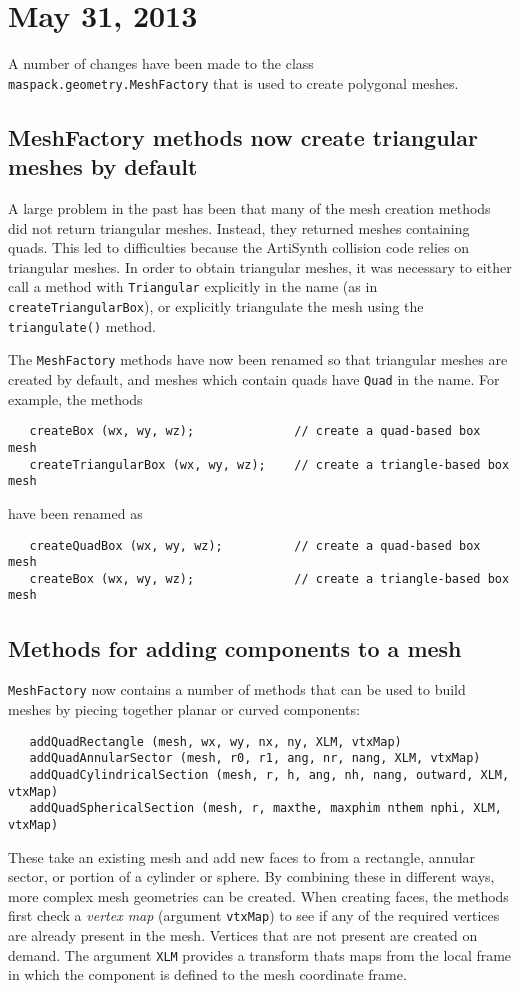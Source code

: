 \documentclass{article}
\begin{document}
\section*{May 31, 2013}

A number of changes have been made to the class {\tt
maspack.geometry.MeshFactory} that is used to create polygonal meshes.

\subsection*{MeshFactory methods now create triangular meshes by
default}

A large problem in the past has been that many of the mesh creation
methods did not return triangular meshes. Instead, they returned
meshes containing quads. This led to difficulties because the
ArtiSynth collision code relies on triangular meshes. In order to
obtain triangular meshes, it was necessary to either call a method
with {\tt Triangular} explicitly in the name (as in {\tt
createTriangularBox}), or explicitly triangulate the mesh using the
{\tt triangulate()} method.

The {\tt MeshFactory} methods have now been renamed so that triangular
meshes are created by default, and meshes which contain quads have
{\tt Quad} in the name. For example, the methods
\begin{lstlisting}
   createBox (wx, wy, wz);              // create a quad-based box mesh
   createTriangularBox (wx, wy, wz);    // create a triangle-based box mesh
\end{lstlisting}
have been renamed as
\begin{lstlisting}
   createQuadBox (wx, wy, wz);          // create a quad-based box mesh
   createBox (wx, wy, wz);              // create a triangle-based box mesh
\end{lstlisting}

\subsection*{Methods for adding components to a mesh}

{\tt MeshFactory} now contains a number of methods that can be used to
build meshes by piecing together planar or curved components:
\begin{lstlisting}
   addQuadRectangle (mesh, wx, wy, nx, ny, XLM, vtxMap)
   addQuadAnnularSector (mesh, r0, r1, ang, nr, nang, XLM, vtxMap)
   addQuadCylindricalSection (mesh, r, h, ang, nh, nang, outward, XLM, vtxMap)
   addQuadSphericalSection (mesh, r, maxthe, maxphim nthem nphi, XLM, vtxMap)
\end{lstlisting}
These take an existing mesh and add new faces to from a rectangle,
annular sector, or portion of a cylinder or sphere. By combining these
in different ways, more complex mesh geometries can be created. When
creating faces, the methods first check a {\it vertex map} (argument
{\tt vtxMap}) to see if any of the required vertices are already
present in the mesh. Vertices that are not present are created on
demand.  The argument {\tt XLM} provides a transform thats maps from
the local frame in which the component is defined to the mesh
coordinate frame.
\end{document}
